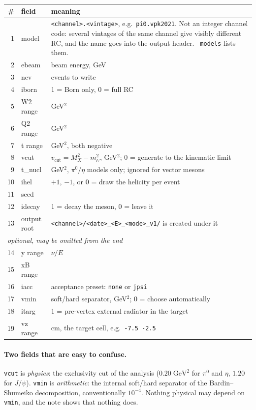 \documentclass[11pt]{article}
\newcommand{\vcut}{v_{\mathrm{cut}}}
\newcommand{\code}[1]{\texttt{#1}}
\begin{document}
\begin{center}
\small
\begin{tabular}{rlp{9.2cm}}
\toprule
\# & field & meaning \\
\midrule
1  & model      & \code{<channel>.<vintage>}, e.g.\ \code{pi0.vpk2021}. Not an
                  integer channel code: several vintages of the same channel
                  give visibly different RC, and the name goes into the output
                  header. \code{--models} lists them. \\
2  & ebeam      & beam energy, GeV \\
3  & nev        & events to write \\
4  & iborn      & 1 = Born only, 0 = full RC \\
5  & W2 range   & GeV$^2$ \\
6  & Q2 range   & GeV$^2$ \\
7  & t range    & GeV$^2$, both negative \\
8  & vcut       & $\vcut = M_X^2 - m_U^2$, GeV$^2$; 0 = generate to the
                  kinematic limit \\
9  & t\_nucl    & GeV$^2$, $\pi^0/\eta$ models only; ignored for vector mesons \\
10 & ihel       & $+1$, $-1$, or 0 = draw the helicity per event \\
11 & seed       & \\
12 & idecay     & 1 = decay the meson, 0 = leave it \\
13 & output root& \code{<channel>/<date>\_<E>\_<mode>\_v1/} is created under it \\
\midrule
\multicolumn{3}{l}{\emph{optional, may be omitted from the end}}\\
14 & y range    & $\nu/E$ \\
15 & xB range   & \\
16 & iacc       & acceptance preset: \code{none} or \code{jpsi} \\
17 & vmin       & soft/hard separator, GeV$^2$; 0 = choose automatically \\
18 & itarg      & 1 = pre-vertex external radiator in the target \\
19 & vz range   & cm, the target cell, e.g.\ \code{-7.5 -2.5} \\
\bottomrule
\end{tabular}
\end{center}

\paragraph{Two fields that are easy to confuse.}
\code{vcut} is \emph{physics}: the exclusivity cut of the analysis
($0.20\;\mathrm{GeV}^2$ for $\pi^0$ and $\eta$, $1.20$ for $J/\psi$).
\code{vmin} is \emph{arithmetic}: the internal soft/hard separator of the
Bardin--Shumeiko decomposition, conventionally $10^{-4}$. Nothing physical may
depend on \code{vmin}, and the note shows that nothing does.
\end{document}
